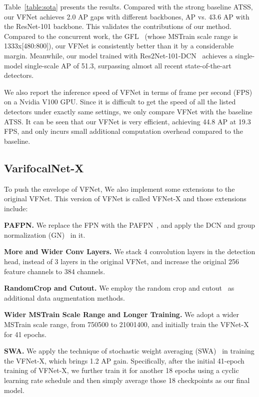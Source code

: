 Table~\ref{table:sota} presents the results. Compared with the strong baseline ATSS, our VFNet achieves 2.0 AP gaps with different backbones,  AP vs. 43.6 AP with the ResNet-101 backbone. This validates the contributions of our method. Compared to the concurrent work, the GFL~\cite{GFL} (whose MSTrain scale range is 1333x[480:800]), our VFNet is consistently better than it by a considerable margin. Meanwhile, our model trained with Res2Net-101-DCN~\cite{Res2Net} achieves a single-model single-scale AP of 51.3, surpassing almost all recent state-of-the-art detectors.

We also report the inference speed of VFNet in terms of frame per second (FPS) on a Nvidia V100 GPU. Since it is difficult to get the speed of all the listed detectors under exactly same settings, we only compare VFNet with the baseline ATSS. 
It can be seen that our VFNet is very efficient, \eg achieving 44.8 AP at 19.3 FPS, and only incurs small additional computation overhead compared to the baseline.


\vspace{-0.5mm}
\subsection{VarifocalNet-X}
To push the envelope of VFNet, We also implement some extensions to the original VFNet. This version of VFNet is called VFNet-X and those extensions include: 

\noindent \textbf{PAFPN.} We replace the FPN with the PAFPN~\cite{PAFPN}, and apply the DCN and group normalization (GN)~\cite{GN} in it.

\noindent \textbf{More and Wider Conv Layers.} We stack 4 convolution layers in the detection head, instead of 3 layers in the original VFNet, and increase the original 256 feature channels to 384 channels. 

\noindent \textbf{RandomCrop and Cutout.} We employ the random crop and cutout~\cite{cutout} as additional data augmentation methods.

\noindent \textbf{Wider MSTrain Scale Range and Longer Training.} We adopt a wider MSTrain scale range, from 750500 to 21001400, and initially train the VFNet-X for 41 epochs.

\noindent \textbf{SWA.} We apply the technique of stochastic weight averaging (SWA)~\cite{SWA} in training the VFNet-X, which brings 1.2 AP gain. Specifically, after the initial 41-epoch training of VFNet-X, we further train it for another 18 epochs using a cyclic learning rate schedule and then simply average those 18 checkpoints as our final model.


